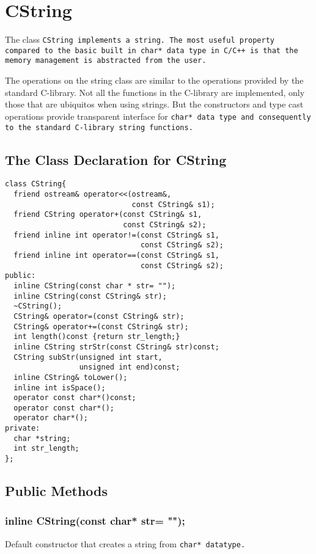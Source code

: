 \section{CString}

The class \tt CString \rm implements a string. The most
useful property compared to the basic built in \tt char* \rm
data type in C/C++ is that the memory management is abstracted 
from the user.

The  operations on  the  string  class  are similar  to the operations
provided by the standard  C-library. Not all the functions in the C-library
are implemented, only those that are ubiquitos when using 
strings. But the constructors  and  type cast
operations  provide transparent interface for \tt char* \rm data
type and consequently to the standard C-library string functions. 

\subsection{The Class Declaration for CString}
\begin{verbatim}
class CString{
  friend ostream& operator<<(ostream&,
                             const CString& s1);
  friend CString operator+(const CString& s1, 
                           const CString& s2);
  friend inline int operator!=(const CString& s1, 
                               const CString& s2);
  friend inline int operator==(const CString& s1, 
                               const CString& s2);
public:
  inline CString(const char * str= "");
  inline CString(const CString& str);
  ~CString();
  CString& operator=(const CString& str);
  CString& operator+=(const CString& str);
  int length()const {return str_length;}
  inline CString strStr(const CString& str)const;
  CString subStr(unsigned int start, 
                 unsigned int end)const;
  inline CString& toLower();
  inline int isSpace();
  operator const char*()const;
  operator const char*();
  operator char*();
private:
  char *string;
  int str_length;
};
\end{verbatim}

\subsection{Public Methods}

\subsubsection{inline CString(const char* str= "");}
Default constructor that creates a string from \tt char* \rm datatype. 

